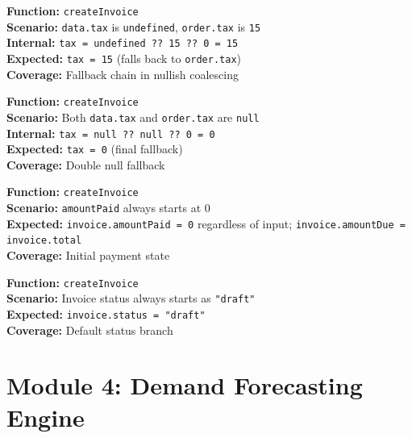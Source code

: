 \documentclass[12pt,a4paper]{report}
\newcommand{\pone}{\textbf{\color{p1red}P1}}
\newcommand{\ptwo}{\textbf{\color{p2orange}P2}}
\begin{document}
\begin{tcolorbox}[testbox, title={INV-009 \hfill \ptwo}]
\textbf{Function:} \texttt{createInvoice} \\
\textbf{Scenario:} \texttt{data.tax} is \texttt{undefined}, \texttt{order.tax} is \texttt{15} \\
\textbf{Internal:} \texttt{tax = undefined ?? 15 ?? 0 = 15} \\
\textbf{Expected:} \texttt{tax = 15} (falls back to \texttt{order.tax}) \\
\textbf{Coverage:} Fallback chain in nullish coalescing
\end{tcolorbox}

\begin{tcolorbox}[testbox, title={INV-010 \hfill \ptwo}]
\textbf{Function:} \texttt{createInvoice} \\
\textbf{Scenario:} Both \texttt{data.tax} and \texttt{order.tax} are \texttt{null} \\
\textbf{Internal:} \texttt{tax = null ?? null ?? 0 = 0} \\
\textbf{Expected:} \texttt{tax = 0} (final fallback) \\
\textbf{Coverage:} Double null fallback
\end{tcolorbox}

\begin{tcolorbox}[testbox, title={INV-011 \hfill \pone}]
\textbf{Function:} \texttt{createInvoice} \\
\textbf{Scenario:} \texttt{amountPaid} always starts at 0 \\
\textbf{Expected:} \texttt{invoice.amountPaid = 0} regardless of input; \texttt{invoice.amountDue = invoice.total} \\
\textbf{Coverage:} Initial payment state
\end{tcolorbox}

\begin{tcolorbox}[testbox, title={INV-012 \hfill \pone}]
\textbf{Function:} \texttt{createInvoice} \\
\textbf{Scenario:} Invoice status always starts as \texttt{"draft"} \\
\textbf{Expected:} \texttt{invoice.status = "draft"} \\
\textbf{Coverage:} Default status branch
\end{tcolorbox}



\chapter{Module 4: Demand Forecasting Engine}
\end{document}
